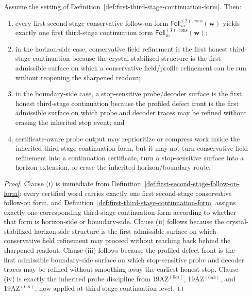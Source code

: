 \begin{proposition}
\label{prop:every-first-second-stage-conservative-bifurcation-yields-exactly-one-first-third-stage-continuation-form}
Assume the setting of Definition~\ref{def:first-third-stage-continuation-form}. Then:
\begin{enumerate}[label=(\roman*)]
 \item every first second-stage conservative follow-on form \(\mathsf{Foll}^{(2),\mathrm{cons}}_{m}(\mathbf w)\) yields exactly one first third-stage continuation form \(\mathsf{Foll}^{(3),\mathrm{cons}}_{m}(\mathbf w)\);
 \item in the horizon-side case, conservative field refinement is the first honest third-stage continuation because the crystal-stabilized structure is the first admissible surface on which a conservative field/profile refinement can be run without reopening the sharpened readout;
 \item in the boundary-side case, a stop-sensitive probe/decoder surface is the first honest third-stage continuation because the profiled defect front is the first admissible surface on which probe and decoder traces may be refined without erasing the inherited stop event; and
 \item certificate-aware probe output may reprioritize or compress work inside the inherited third-stage continuation form, but it may not turn conservative field refinement into a continuation certificate, turn a stop-sensitive surface into a horizon extension, or erase the inherited horizon/boundary route.
\end{enumerate}
\end{proposition}

\begin{proof}
Clause (i) is immediate from Definition~\ref{def:first-second-stage-follow-on-form}: every certified word carries exactly one first second-stage conservative follow-on form, and Definition~\ref{def:first-third-stage-continuation-form} assigns exactly one corresponding third-stage continuation form according to whether that form is horizon-side or boundary-side. Clause (ii) follows because the crystal-stabilized horizon-side structure is the first admissible surface on which conservative field refinement may proceed without reaching back behind the sharpened readout. Clause (iii) follows because the profiled defect front is the first admissible boundary-side surface on which stop-sensitive probe and decoder traces may be refined without smoothing away the earliest honest stop. Clause (iv) is exactly the inherited probe discipline from 19AZ$^{(6ai)}$, 19AZ$^{(6ak)}$, and 19AZ$^{(6al)}$, now applied at third-stage continuation level.
\end{proof}

